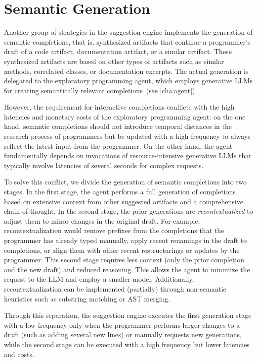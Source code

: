 
\section{Semantic Generation}
\label{sec:suggestions/generation}

Another group of strategies in the suggestion engine implements the generation of semantic completions, that is, synthesized artifacts that continue a programmer's draft of a code artifact, documentation artifact, or a similar artifact.
These synthesized artifacts are based on other types of artifacts such as similar methods, correlated classes, or documentation excerpts.
The actual generation is delegated to the exploratory programming agent, which employs generative LLMs for creating semantically relevant completions~(see \cref{cha:agent}).

However, the requirement for interactive completions conflicts with the high latencies and monetary costs of the exploratory programming agent:
on the one hand, semantic completions should not introduce temporal distances in the research process of programmers but be updated with a high frequency to always reflect the latest input from the programmer.
On the other hand, the agent fundamentally depends on invocations of resource-intensive generative LLMs that typically involve latencies of several seconds for complex requests.

To solve this conflict, we divide the generation of semantic completions into two stages.
In the first stage, the agent performs a full generation of completions based on extensive context from other suggested artifacts and a comprehensive chain of thought.
In the second stage, the prior generations are \emph{recontextualized} to adjust them to minor changes in the original draft.
For example, recontextualization would remove prefixes from the completions that the programmer has already typed manually, apply recent renamings in the draft to completions, or align them with other recent restructurings or updates by the programmer.
This second stage requires less context (only the prior completion and the new draft) and reduced reasoning.
This allows the agent to minimize the request to the LLM and employ a smaller model.
Additionally, recontextualization can be implemented (partially) through non-semantic heuristics such as substring matching or AST merging.

Through this separation, the suggestion engine executes the first generation stage with a low frequency only when the programmer performs larger changes to a draft (such as adding several new lines) or manually requests new generations, while the second stage can be executed with a high frequency but lower latencies and costs.
